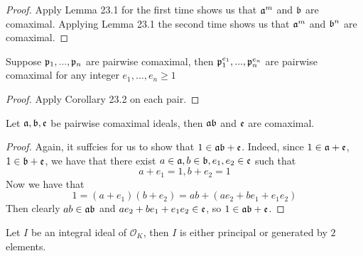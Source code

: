 \begin{proof}
Apply Lemma 23.1 for the first time shows us that $\mathfrak{a}^m$ and $\mathfrak{b}$ are comaximal. Applying Lemma 23.1 the second time shows us that $\mathfrak{a}^m$ and $\mathfrak{b}^n$ are comaximal.
\end{proof}

\begin{corollary}
Suppose $\mathfrak{p}_1, ..., \mathfrak{p}_n$ are pairwise comaximal, then $\mathfrak{p}_1^{e_1}, ..., \mathfrak{p}_n^{e_n}$ are pairwise comaximal for any integer $e_1, ..., e_n \geq 1$
\end{corollary}

\begin{proof}
Apply Corollary 23.2 on each pair.
\end{proof}

\begin{lemma}
Let $\mathfrak{a}, \mathfrak{b}, \mathfrak{e}$ be pairwise comaximal ideals, then $\mathfrak{a} \mathfrak{b}$ and $\mathfrak{e}$ are comaximal.
\end{lemma}

\begin{proof}
Again, it suffcies for us to show that $1 \in \mathfrak{a} \mathfrak{b} + \mathfrak{e}$. Indeed, since $1 \in \mathfrak{a} + \mathfrak{e}$, $1 \in \mathfrak{b} + \mathfrak{e}$, we have that there exist $a \in \mathfrak{a}, b \in \mathfrak{b}, e_1, e_2 \in \mathfrak{e}$ such that
\[a + e_1 = 1, b + e_2 = 1\]
Now we have that
\[1 = (a + e_1)(b + e_2) = ab + (ae_2 + be_1 + e_1e_2)\]
Then clearly $ab \in \mathfrak{a} \mathfrak{b}$ and $ae_2 + be_1 + e_1e_2 \in \mathfrak{e}$, so $1 \in \mathfrak{a} \mathfrak{b} + \mathfrak{e}$.
\end{proof}

\begin{theorem}
Let $I$ be an integral ideal of $\mathcal{O}_K$, then $I$ is either principal or generated by $2$ elements.
\end{theorem}

